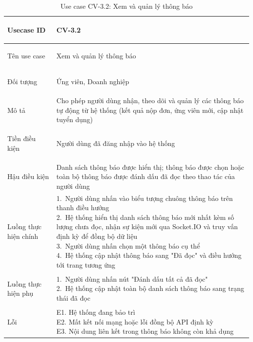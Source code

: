 \begin{table}[H]
    \centering
    \small
    \renewcommand{\arraystretch}{1.0}
    \begin{tabularx}{\textwidth}{|
        >{\bfseries\raggedright\arraybackslash}p{3.2cm}|Y|}
        \hline

        Usecase ID & CV-3.2 \\ \hline

        Tên use case & Xem và quản lý thông báo \\ \hline

        Đối tượng & Ứng viên, Doanh nghiệp \\ \hline

        Mô tả & Cho phép người dùng nhận, theo dõi và quản lý các thông báo tự động từ hệ thống (kết quả nộp đơn, ứng viên mới, cập nhật tuyển dụng) \\ \hline

        Tiền điều kiện & Người dùng đã đăng nhập vào hệ thống \\ \hline

        Hậu điều kiện & Danh sách thông báo được hiển thị; thông báo được chọn hoặc toàn bộ thông báo được đánh dấu đã đọc theo thao tác của người dùng \\ \hline

        Luồng thực hiện chính &
        \parbox[t]{\hsize}{
            1.\ Người dùng nhấn vào biểu tượng chuông thông báo trên thanh điều hướng\\
            2.\ Hệ thống hiển thị danh sách thông báo mới nhất kèm số lượng chưa đọc, nhận sự kiện mới qua Socket.IO và truy vấn định kỳ để đồng bộ dữ liệu\\
            3.\ Người dùng nhấn chọn một thông báo cụ thể\\
            4.\ Hệ thống cập nhật thông báo sang "Đã đọc" và điều hướng tới trang tương ứng
        }\\
        \hline

        Luồng thực hiện phụ &
        \parbox[t]{\hsize}{
            1.\ Người dùng nhấn nút "Đánh dấu tất cả đã đọc"\\
            2.\ Hệ thống cập nhật toàn bộ danh sách thông báo sang trạng thái đã đọc
        }\\
        \hline

        Lỗi &
        \parbox[t]{\hsize}{
            E1. Hệ thống đang bảo trì\\
            E2. Mất kết nối mạng hoặc lỗi đồng bộ API định kỳ\\
            E3. Nội dung liên kết trong thông báo không còn khả dụng
        }\\
        \hline

    \end{tabularx}

    \caption{Use case CV-3.2: Xem và quản lý thông báo}
    \label{tab:usecase-cv32}
\end{table}

